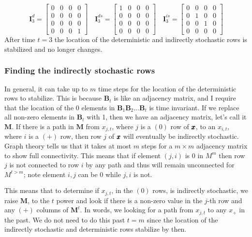 \documentclass[]{article}
\def\BB{\mbox{$\mathbf B$}}	\def\bb{\mbox{$\mathbf b$}}
\def\II{\mbox{$\mathbf I$}} \def\ii{\mbox{$\mathbf i$}}
\def\MM{\mbox{$\mathbf M$}}  \def\mm{\mbox{$\mathbf m$}}
\begin{document}
\begin{equation}
\II_3^d=\begin{bmatrix}
0&0&0&0\\
0&0&0&0\\
0&0&0&0\\
0&0&0&1
\end{bmatrix}
\quad
\II_3^{ds}=\begin{bmatrix}
1&0&0&0\\
0&0&0&0\\
0&0&0&0\\
0&0&0&0
\end{bmatrix}
\quad
\II_3^{is}=\begin{bmatrix}
0&0&0&0\\
0&1&0&0\\
0&0&1&0\\
0&0&0&0
\end{bmatrix}
\end{equation}
After time $t=3$ the location of the deterministic and indirectly stochastic rows is stabilized and no longer changes.  

\subsubsection*{Finding the indirectly stochastic rows}

In general, it can take up to $m$ time steps for the location of the deterministic rows to stabilize.  This is because $\BB_t$ is like an adjacency matrix, and I require that the location of the 0 elements in $\BB_1\BB_2\dots\BB_t$ is time invariant. If we replace all non-zero elements in $\BB_t$ with 1, then we have an adjacency matrix, let's call it $\MM$.  If there is a path in $\MM$ from $x_{j,t}$, where $j$ is a $(0)$ row of $\mbox{$\pmb{x}$}$, to an $x_{i,t}$, where $i$ is a $(+)$ row, then row $j$ of $\mbox{$\pmb{x}$}$ will eventually be indirectly stochastic. Graph theory tells us that it takes at most $m$ steps for a $m \times m$ adjacency matrix to show full connectivity. This means that if element $(j,i)$ is 0 in $M^m$ then row $j$ is not connected to row $i$ by any path and thus will remain unconnected for $M^{t>m}$; note element $i,j$ can be 0 while $j,i$ is not.

This means that to determine if $x_{j,t}$, in the $(0)$ rows, is indirectly stochastic, we raise $\MM$, to the $t$ power and look if there is a non-zero value in the $j$-th row and any $(+)$ columns of $\MM^t$.  In words, we looking for a path from $x_{j,t}$ to any $x_{+}$ in the past. We do not need to do this past $t=m$ since the location of the indirectly stochastic and deterministic rows stabilize by then.
\end{document}
